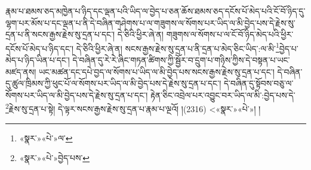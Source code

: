རྣམ་པ་ཐམས་ཅད་མཁྱེན་པ་ཉིད་དང་ལྡན་པའི་ཡིད་ལ་བྱེད་པ་ཅན་ཆོས་ཐམས་ཅད་དངོས་པོ་མེད་པའི་ངོ་བོ་ཉིད་དུ་ལྷག་པར་མོས་པ་དང་ལྡན་པ་ནི་དེ་བཞིན་གཤེགས་པ་ལ་གཟུགས་ལ་སོགས་པར་ཡིད་ལ་མི་བྱེད་པས་དེ་རྗེས་སུ་དྲན་པ་ནི་སངས་རྒྱས་རྗེས་སུ་དྲན་པ་དང་། དེ་ཅིའི་ཕྱིར་ཞེ་ན། གཟུགས་ལ་སོགས་པ་ལ་ངོ་བོ་ཉིད་མེད་པའི་ཕྱིར་དངོས་པོ་མེད་པ་ཉིད་དང་། དེ་ཅིའི་ཕྱིར་ཞེ་ན། སངས་རྒྱས་རྗེས་སུ་དྲན་པ་ནི་དྲན་པ་མེད་ཅིང་ཡིད་:ལ་མི་\footnote{«སྣར་»«པེ་»ལ་}བྱེད་པ་མེད་པ་ཉིད་ཡིན་པ་དང་། དེ་བཞིན་དུ་རེ་རེ་ཞིང་གཏན་ཚིགས་ཀྱི་སྦྱོར་བ་དྲུག་པ་གཉིས་ཀྱིས་དེ་བསྟན་པ་ཡང་མཛད་ནས། ཡང་མཚན་དང་དཔེ་བྱད་ལ་སོགས་པ་ཡིད་ལ་མི་བྱེད་པས་སངས་རྒྱས་རྗེས་སུ་དྲན་པ་དང་། དེ་བཞིན་དུ་ཚུལ་ཁྲིམས་ཀྱི་ཕུང་པོ་ལ་སོགས་པར་ཡིད་ལ་མི་བྱེད་པས་དེ་རྗེས་སུ་དྲན་པ་དང་། དེ་བཞིན་དུ་སྟོབས་བཅུ་ལ་སོགས་པར་ཡིད་ལ་མི་བྱེད་པས་དེ་རྗེས་སུ་དྲན་པ་དང་། རྟེན་ཅིང་འབྲེལ་པར་འབྱུང་བར་ཡིད་ལ་མི་:བྱེད་པས་དེ་\footnote{«སྣར་»«པེ་»བྱེད་པས་}རྗེས་སུ་དྲན་པ་སྟེ། དེ་ལྟར་སངས་རྒྱས་རྗེས་སུ་དྲན་པ་རྣམ་པ་ལྔའོ། །(2316) <«སྣར་»«པེ་»། །
